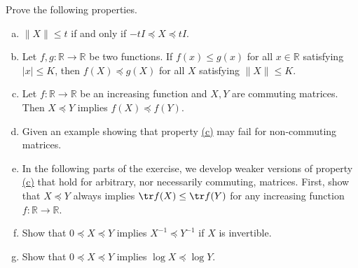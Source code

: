 \begin{problem*}[Exercise 5.4.5]\label{ex5.4.5}
	Prove the following properties.
	\begin{enumerate}[(a)]
		\item\label{ex5.4.5:a} \(\lVert X \rVert \leq t\) if and only if \(-t I \preceq X \preceq t I\).
		\item\label{ex5.4.5:b} Let \(f, g \colon \mathbb{R} \to \mathbb{R} \) be two functions. If \(f(x) \leq g(x)\) for all \(x \in \mathbb{R} \) satisfying \(\lvert x \rvert \leq K\), then \(f(X) \preceq g(X)\) for all \(X\) satisfying \(\lVert X \rVert \leq K\).
		\item\label{ex5.4.5:c} Let \(f \colon \mathbb{R} \to \mathbb{R} \) be an increasing function and \(X, Y\) are commuting matrices. Then \(X \preceq Y\) implies \(f(X) \preceq f(Y)\).
		\item\label{ex5.4.5:d} Given an example showing that property \hyperref[ex5.4.5:c]{(c)} may fail for non-commuting matrices.
		\item\label{ex5.4.5:e} In the following parts of the exercise, we develop weaker versions of property \hyperref[ex5.4.5:c]{(c)} that hold for arbitrary, nor necessarily commuting, matrices. First, show that \(X \preceq Y\) always implies \(\tr f(X) \leq \tr f(Y)\) for any increasing function \(f \colon \mathbb{R} \to \mathbb{R} \).
		\item\label{ex5.4.5:f} Show that \(0 \preceq X \preceq Y\) implies \(X ^{-1} \preceq Y ^{-1} \) if \(X\) is invertible.
		\item\label{ex5.4.5:g} Show that \(0 \preceq X \preceq Y\) implies \(\log X \preceq \log Y\).
	\end{enumerate}
\end{problem*}
